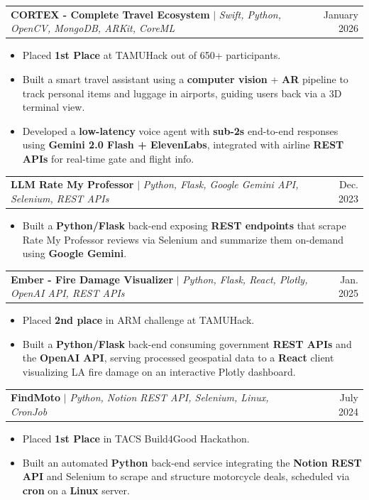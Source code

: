 \documentclass[letterpaper,10pt]{article}
\makeatletter
\newcommand{\resumeItem}[1]{
  \item\small{
    {#1 \vspace{-2pt}}
  }
}
\newcommand{\resumeProjectHeading}[2]{
    \item
    \begin{tabular*}{0.97\textwidth}{l@{\extracolsep{\fill}}r}
      \small#1 & #2 \\
    \end{tabular*}\vspace{-7pt}
}
\newcommand{\resumeItemListStart}{\begin{itemize}[itemsep=-2pt]}
\newcommand{\resumeItemListEnd}{\end{itemize}\vspace{-5pt}}
\makeatother
\begin{document}
    \resumeProjectHeading
          {\textbf{CORTEX - Complete Travel Ecosystem} $|$ \emph{Swift, Python, OpenCV, MongoDB, ARKit, CoreML}}{January 2026}
          \resumeItemListStart
            \resumeItem{Placed \textbf{1st Place} at TAMUHack out of 650+ participants.}
            \resumeItem{Built a smart travel assistant using a \textbf{computer vision} + \textbf{AR} pipeline to track personal items and luggage in airports, guiding users back via a 3D terminal view.}
            \resumeItem{Developed a \textbf{low-latency} voice agent with \textbf{sub-2s} end-to-end responses using \textbf{Gemini 2.0 Flash + ElevenLabs}, integrated with airline \textbf{REST APIs} for real-time gate and flight info.}
          \resumeItemListEnd

    \resumeProjectHeading
          {\textbf{LLM Rate My Professor} $|$ \emph{Python, Flask, Google Gemini API, Selenium, REST APIs}}{Dec. 2023}
          \resumeItemListStart
            \resumeItem{Built a \textbf{Python/Flask} back-end exposing \textbf{REST endpoints} that scrape Rate My Professor reviews via Selenium and summarize them on-demand using \textbf{Google Gemini}.}
          \resumeItemListEnd

    \resumeProjectHeading
    {\textbf{Ember - Fire Damage Visualizer} $|$ \emph{Python, Flask, React, Plotly, OpenAI API, REST APIs}}{Jan. 2025}
    \resumeItemListStart
      \resumeItem{Placed \textbf{2nd place} in ARM challenge at TAMUHack.}
      \resumeItem{Built a \textbf{Python/Flask} back-end consuming government \textbf{REST APIs} and the \textbf{OpenAI API}, serving processed geospatial data to a \textbf{React} client visualizing LA fire damage on an interactive Plotly dashboard.}
    \resumeItemListEnd


    \resumeProjectHeading
          {\textbf{FindMoto} $|$ \emph{Python, Notion REST API, Selenium, Linux, CronJob}}{July 2024}
          \resumeItemListStart
            \resumeItem{Placed \textbf{1st Place} in TACS Build4Good Hackathon.}
            \resumeItem{Built an automated \textbf{Python} back-end service integrating the \textbf{Notion REST API} and Selenium to scrape and structure motorcycle deals, scheduled via \textbf{cron} on a \textbf{Linux} server.}
          \resumeItemListEnd


    

\end{document}
